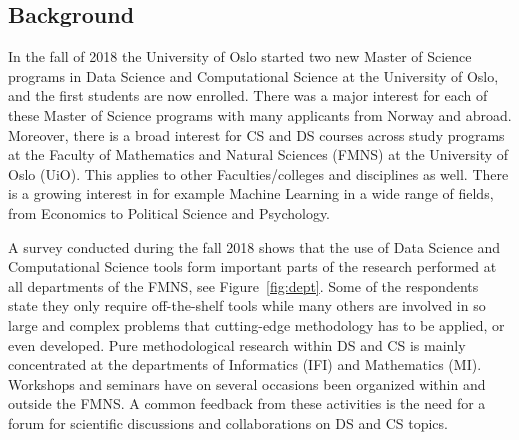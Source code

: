 \documentclass[a4paper,10pt]{article}
\begin{document}
\subsection{Background}
In the fall of 2018 the University of Oslo started two new Master of Science  programs in Data Science and Computational Science at the University of Oslo, and the first students are now enrolled. There was a major interest for each of these Master of Science programs with many applicants from Norway and abroad. Moreover, there is  a  broad interest for CS  and DS courses 
across study programs at the Faculty of Mathematics and Natural Sciences (FMNS) at the University of Oslo (UiO). This applies to other Faculties/colleges and disciplines as well. There is a growing interest in for example Machine Learning in a wide range of fields, from Economics to Political Science and Psychology. 

A survey conducted during the fall 2018 shows that the use of Data Science and Computational Science tools form important parts of the research performed at all departments of the FMNS, see Figure~\ref{fig:dept}.
 Some of the respondents state they only require off-the-shelf tools while many others are involved in so large and complex problems that cutting-edge methodology has to be applied, or even developed. Pure methodological research within DS and CS is mainly concentrated at the departments of Informatics (IFI) and Mathematics (MI). Workshops and seminars have on several occasions been organized within and outside the FMNS. A common feedback from these activities is the need for a forum for scientific discussions and collaborations on DS and CS topics.
\end{document}
